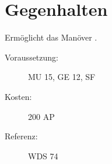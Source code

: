 \section{Gegenhalten}
\label{sf.gegenhalten}
Ermöglicht das Manöver .
\begin{description}
    \item[Voraussetzung:]
        MU 15, GE 12, SF 
    \item [Kosten:]
        200 AP
    \item [Referenz:]
        WDS 74
\end{description}
